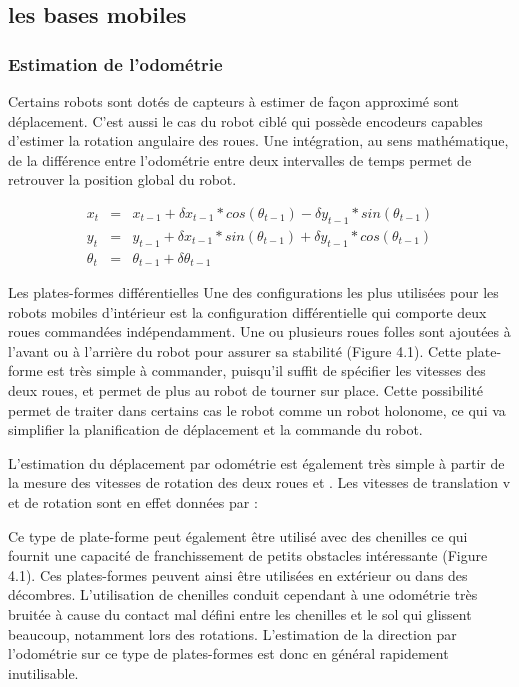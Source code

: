 \subsection{les bases mobiles}

\subsubsection{Estimation de l'odométrie}

Certains robots sont dotés de capteurs à estimer de façon
approximé sont déplacement. C'est aussi le cas du robot ciblé qui
possède encodeurs capables d'estimer la rotation angulaire des
roues. Une intégration, au sens mathématique, de la différence entre
l'odométrie entre deux intervalles de temps permet de retrouver la
position global du robot.

\begin{equation*}
	\begin{array}{rcl}
		x_t &=& x_{t-1} + \delta x_{t-1} * cos(\theta_{t-1}) - \delta y_{t-1} * sin(\theta_{t-1}) \\
		y_t &=& y_{t-1} + \delta x_{t-1} * sin(\theta_{t-1}) + \delta y_{t-1} * cos(\theta_{t-1}) \\
		\theta_t &=& \theta_{t-1} + \delta\theta_{t-1}
	\end{array}
\end{equation*}


Les plates-formes différentielles Une des configurations les plus utilisées pour les robots mobiles d’intérieur est la configuration différentielle qui comporte deux roues commandées indépendamment. Une ou plusieurs roues folles sont ajoutées à l’avant ou à l’arrière du robot pour assurer sa stabilité (Figure 4.1). Cette plate-forme est très simple à commander, puisqu’il suffit de spécifier les vitesses des deux roues, et permet de plus au robot de tourner sur place. Cette possibilité permet de traiter dans certains cas le robot comme un robot holonome, ce qui va simplifier la planification de déplacement et la commande du robot.

L’estimation du déplacement par odométrie est également très simple à partir de la mesure des vitesses de rotation des deux roues et . Les vitesses de translation v et de rotation sont en effet données par :

Ce type de plate-forme peut également être utilisé avec des chenilles ce qui fournit une capacité de franchissement de petits obstacles intéressante (Figure 4.1). Ces plates-formes peuvent ainsi être utilisées en extérieur ou dans des décombres. L’utilisation de chenilles conduit cependant à une odométrie très bruitée à cause du contact mal défini entre les chenilles et le sol qui glissent beaucoup, notamment lors des rotations. L’estimation de la direction par l’odométrie sur ce type de plates-formes est donc en général rapidement inutilisable.

